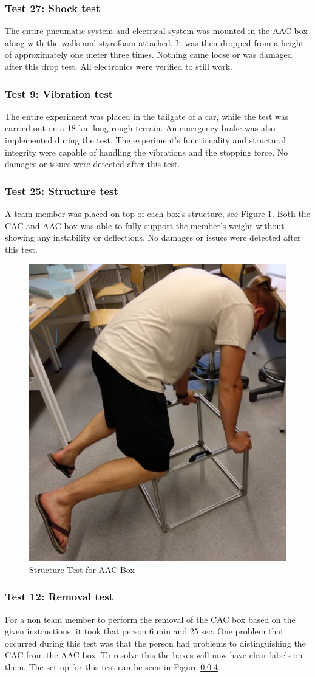 \subsubsection{Test 27: Shock test}
The entire pneumatic system and electrical system was mounted in the AAC box along with the walls and styrofoam attached. It was then dropped from a height of approximately one meter three times. Nothing came loose or was damaged after this drop test. All electronics were verified to still work.

\subsubsection{Test 9: Vibration test}
The entire experiment was placed in the tailgate of a car, while the test was carried out on a 18 km long rough terrain. An emergency brake was also implemented during the test. The experiment's functionality and structural integrity were capable of handling the vibrations and the stopping force.
No damages or issues were detected after this test. 

\subsubsection{Test 25: Structure test}
A team member was placed on top of each box's structure, see Figure \ref{fig:structure-test}. Both the CAC and AAC box was able to fully support the member's weight without showing any instability or deflections. No damages or issues were detected after this test.

\begin{figure}[H]
    \centering
    \includegraphics[width=0.4\linewidth]{appendix/img/test-results/structure-test.jpeg}
    \caption{Structure Test for AAC Box}
    \label{fig:structure-test}
\end{figure}


\subsubsection{Test 12: Removal test}
For a non team member to perform the removal of the CAC box based on the given instructions, it took that person 6 min and 25 sec. One problem that occurred during this test was that the person had problems to distinguishing the CAC from the AAC box. To resolve this the boxes will now have clear labels on them. The set up for this test can be seen in Figure \ref{}.

